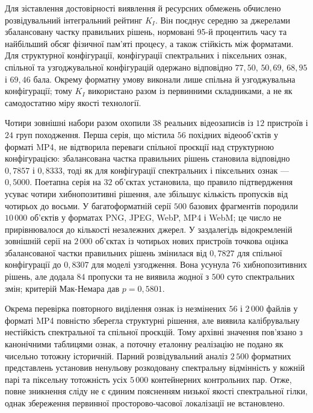 Для зіставлення достовірності виявлення й ресурсних обмежень обчислено розвідувальний інтегральний рейтинг $K_I$. Він поєднує середню за джерелами збалансовану частку правильних рішень, нормовані 95-й процентиль часу та найбільший обсяг фізичної пам’яті процесу, а також стійкість між форматами. Для структурної конфігурації, конфігурації спектральних і піксельних ознак, спільної та узгоджувальної конфігурацій одержано відповідно $77{,}50$, $50{,}69$, $68{,}95$ і $69{,}46$ бала. Окрему форматну умову виконали лише спільна й узгоджувальна конфігурації; тому $K_I$ використано разом із первинними складниками, а не як самодостатню міру якості технології.

Чотири зовнішні набори разом охопили $38$ реальних відеозаписів із $12$ пристроїв і $24$ груп походження. Перша серія, що містила $56$ похідних відеооб’єктів у форматі MP4, не відтворила переваги спільної проєкції над структурною конфігурацією: збалансована частка правильних рішень становила відповідно $0{,}7857$ і $0{,}8333$, тоді як для конфігурації спектральних і піксельних ознак --- $0{,}5000$. Поетапна серія на $32$ об’єктах установила, що правило підтвердження усуває чотири хибнопозитивні рішення, але збільшує кількість пропусків від чотирьох до восьми. У багатоформатній серії $500$ базових фрагментів породили $10\,000$ об’єктів у форматах PNG, JPEG, WebP, MP4 і WebM; це число не прирівнювалося до кількості незалежних джерел. У заздалегідь відокремленій зовнішній серії на $2\,000$ об’єктах із чотирьох нових пристроїв точкова оцінка збалансованої частки правильних рішень змінилася від $0{,}7827$ для спільної конфігурації до $0{,}8307$ для моделі узгодження. Вона усунула $76$ хибнопозитивних рішень, але додала $84$ пропуски та не виявила жодної з $500$ суто спектральних змін; критерій Мак-Немара дав $p=0{,}5801$.

Окрема перевірка повторного виділення ознак із незмінених $56$ і $2\,000$ файлів у форматі MP4 повністю зберегла структурні рішення, але виявила калібрувальну нестійкість спектральної та спільної проєкцій. Тому архівні значення пов’язано з канонічними таблицями ознак, а поточну еталонну реалізацію не подано як чисельно тотожну історичній. Парний розвідувальний аналіз $2\,500$ форматних представлень установив ненульову розкодовану спектральну відмінність у кожній парі та піксельну тотожність усіх $5\,000$ контейнерних контрольних пар. Отже, повне зникнення сліду не є єдиним поясненням низької якості спектральної гілки, однак збереження первинної просторово-часової локалізації не встановлено.

